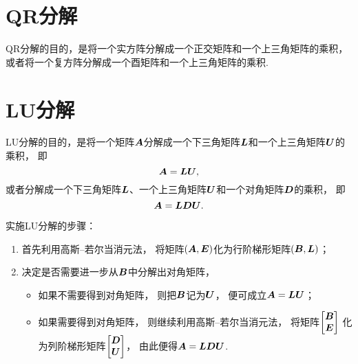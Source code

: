 \section{QR分解}
QR分解的目的，是将一个实方阵分解成一个正交矩阵和一个上三角矩阵的乘积，
或者将一个复方阵分解成一个酉矩阵和一个上三角矩阵的乘积.

\section{LU分解}
LU分解的目的，是将一个矩阵\(\boldsymbol{A}\)分解成一个下三角矩阵\(\boldsymbol{L}\)和一个上三角矩阵\(\boldsymbol{U}\)的乘积，
即\begin{equation*}
	\boldsymbol{A} = \boldsymbol{L} \boldsymbol{U},
\end{equation*}
或者分解成一个下三角矩阵\(\boldsymbol{L}\)、一个上三角矩阵\(\boldsymbol{U}\)和一个对角矩阵\(\boldsymbol{D}\)的乘积，
即\begin{equation*}
	\boldsymbol{A} = \boldsymbol{L} \boldsymbol{D} \boldsymbol{U}.
\end{equation*}

实施LU分解的步骤：\begin{enumerate}
	\item 首先利用高斯--若尔当消元法，
	将矩阵\((\boldsymbol{A},\boldsymbol{E})\)化为行阶梯形矩阵\((\boldsymbol{B},\boldsymbol{L})\)；

	\item 决定是否需要进一步从\(\boldsymbol{B}\)中分解出对角矩阵，\begin{itemize}
		\item 如果不需要得到对角矩阵，
		则把\(\boldsymbol{B}\)记为\(\boldsymbol{U}\)，
		便可成立\(\boldsymbol{A} = \boldsymbol{L} \boldsymbol{U}\)；

		\item 如果需要得到对角矩阵，
		则继续利用高斯--若尔当消元法，
		将矩阵\(\begin{bmatrix}
			\boldsymbol{B} \\
			\boldsymbol{E}
		\end{bmatrix}\)
		化为列阶梯形矩阵\(\begin{bmatrix}
			\boldsymbol{D} \\
			\boldsymbol{U}
		\end{bmatrix}\)，
		由此便得\(\boldsymbol{A} = \boldsymbol{L} \boldsymbol{D} \boldsymbol{U}\).
	\end{itemize}
\end{enumerate}

